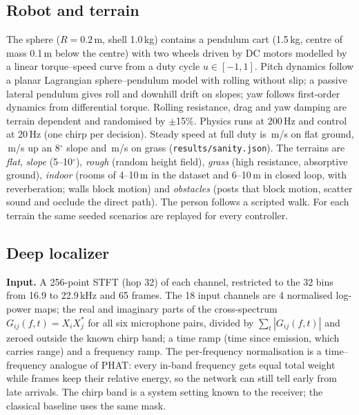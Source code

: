 \subsection{Robot and terrain}

The sphere ($R=0.2$\,m, shell 1.0\,kg) contains a pendulum cart (1.5\,kg, centre of mass 0.1\,m
below the centre) with two wheels driven by DC motors modelled by a linear torque--speed curve
from a duty cycle $u\in[-1,1]$. Pitch dynamics follow a planar Lagrangian sphere--pendulum model
with rolling without slip; a passive lateral pendulum gives roll and downhill drift on slopes;
yaw follows first-order dynamics from differential torque. Rolling resistance, drag and yaw
damping are terrain dependent and randomised by $\pm$15\%. Physics runs at 200\,Hz and control
at 20\,Hz (one chirp per decision). Steady speed at full duty is \VFlatFull\,m/s on flat ground, \VUphillEightFull\,m/s up an
8$^\circ$ slope and \VGrassFull\,m/s on grass (\texttt{results/sanity.json}). The terrains are \emph{flat}, \emph{slope} (5--10$^\circ$),
\emph{rough} (random height field), \emph{grass} (high resistance, absorptive ground),
\emph{indoor} (rooms of 4--10\,m in the dataset and 6--10\,m in closed loop, with reverberation;
walls block motion) and \emph{obstacles}
(posts that block motion, scatter sound and occlude the direct path). The person follows a
scripted walk. For each terrain the same seeded scenarios are replayed for
every controller.

\subsection{Deep localizer}

\textbf{Input.} A 256-point STFT (hop 32) of each channel, restricted to the 32 bins from 16.9 to
22.9\,kHz and 65 frames. The 18 input channels are 4 normalised log-power maps; the real and
imaginary parts of the cross-spectrum $G_{ij}(f,t)=X_i X_j^*$ for all six microphone pairs,
divided by $\sum_t |G_{ij}(f,t)|$ and zeroed outside the known chirp band; a time ramp (time
since emission, which carries range) and a frequency ramp. The per-frequency normalisation is a
time--frequency analogue of PHAT: every in-band frequency gets equal total weight while frames
keep their relative energy, so the network can still tell early from late arrivals. The chirp
band is a system setting known to the receiver; the classical baseline uses the same mask.

